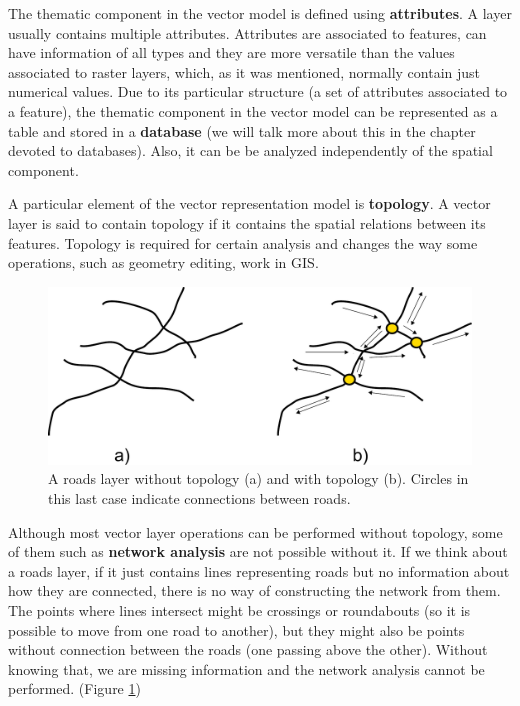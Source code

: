 The thematic component in the vector model is defined using \textbf{attributes}. A layer usually contains multiple attributes. Attributes are associated to features, can have information of all types and they are more versatile than the values associated to raster layers, which, as it was mentioned, normally contain just numerical values. Due to its particular structure (a set of attributes associated to a feature), the thematic component in the vector model can be represented as a table and stored in a \textbf{database} (we will talk more about this in the chapter devoted to databases). Also, it can be be analyzed independently of the spatial component.

A particular element of the vector representation model is \textbf{topology}. A vector layer is said to contain topology if it contains the spatial relations between its features. Topology is required for certain analysis and changes the way some operations, such as geometry editing, work in GIS.

\begin{figure}[!hbt]   
\centering
\includegraphics[width=.8\columnwidth]{Data/Topology_roads.pdf}
\caption{\small A roads layer without topology (a) and with topology (b). Circles in this last case indicate connections between roads.}
\label{Fig:Topology_roads} 
\end{figure}

Although most vector layer operations can be performed without topology, some of them such as \textbf{network analysis} are not possible without it. If we think about a roads layer, if it just contains lines representing roads but no information about how they are connected, there is no way of constructing the network from them. The points where lines intersect might be crossings or roundabouts (so it is possible to move from one road to another), but they might also be points without connection between the roads (one passing above the other). Without knowing that, we are missing information and the network analysis cannot be performed. (Figure \ref{Fig:Topology_roads})

